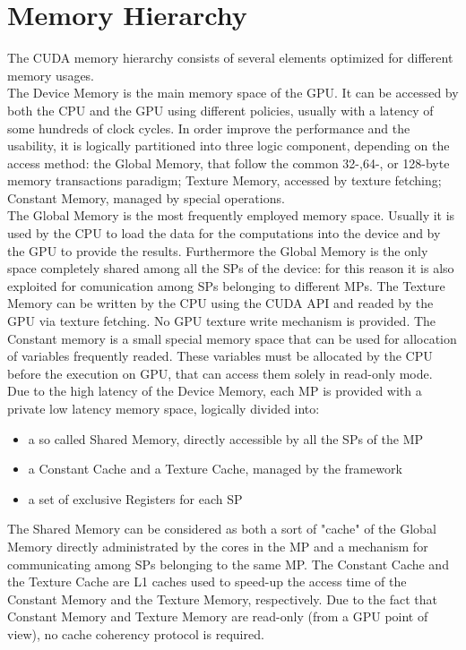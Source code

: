 \section{Memory Hierarchy}
The CUDA memory hierarchy consists of several elements optimized for different memory usages.\\
The Device Memory is the main memory space of the GPU. It can be accessed by both the CPU and the GPU using different policies, usually with a latency of some hundreds of clock cycles. In order improve the performance and the usability, it is logically partitioned into three logic component, depending on the access method: the Global Memory, that follow the common 32-,64-, or 128-byte memory transactions paradigm; Texture Memory, accessed by texture fetching; Constant Memory, managed by special operations.\\
The Global Memory is the most frequently employed memory space. Usually it is used by the CPU to load the data for the computations into the device and by the GPU to provide the results. Furthermore the Global Memory is the only space completely shared among all the SPs of the device: for this reason it is also exploited for comunication among SPs belonging to different MPs. The Texture Memory can be written by the CPU using the CUDA API and readed by the GPU via texture fetching. No GPU texture write mechanism is provided. The Constant memory is a small special memory space that can be used for allocation of variables frequently readed. These variables must be allocated by the CPU before the execution on GPU, that can access them solely in read-only mode.\\ 
Due to the high latency of the Device Memory, each MP is provided with a private low latency memory space, logically divided into:
\begin{itemize}
\item a so called Shared Memory, directly accessible by all the SPs of the MP
\item a Constant Cache and a Texture Cache, managed by the framework
\item a set of exclusive Registers for each SP
\end{itemize}
The Shared Memory can be considered as both a sort of "cache" of the Global Memory %
 directly administrated by the cores in the MP and a mechanism for communicating among SPs belonging to the same MP. The Constant Cache and the Texture Cache are L1 caches used to speed-up the access time of the Constant Memory and the Texture Memory, respectively. Due to the fact that Constant Memory and Texture Memory are read-only (from a GPU point of view), no cache coherency protocol is required.\\ 

